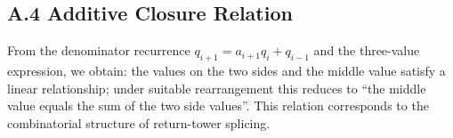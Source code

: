 \subsection*{A.4 Additive Closure Relation}

From the denominator recurrence $q_{i+1}=a_{i+1}q_i+q_{i-1}$ and the three-value expression, we obtain: the values on the two sides and the middle value satisfy a linear relationship; under suitable rearrangement this reduces to ``the middle value equals the sum of the two side values''. This relation corresponds to the combinatorial structure of return-tower splicing.
